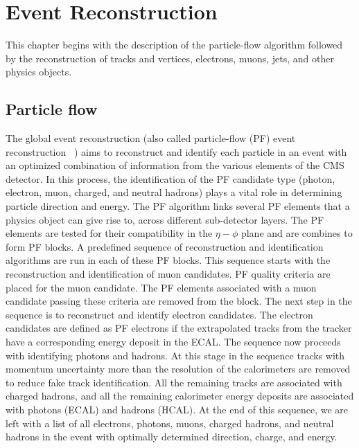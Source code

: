 %
%

\chapter{Event Reconstruction}
\label{chap:event_reco}

This chapter begins with the description of the particle-flow algorithm followed by the reconstruction of tracks and vertices, electrons, muons, jets, and other physics objects.

\section{Particle flow}
\label{p_flow}
The global event reconstruction (also called particle-flow (PF) event reconstruction ~\cite{Sirunyan:2017ulk}) aims to reconstruct and identify each particle in an event with an optimized combination of information from the various elements of the CMS detector. In this process, the identification of the PF candidate type (photon, electron, muon, charged, and neutral hadrons) plays a vital role in determining particle direction and energy. The PF algorithm links several PF elements that a physics object can give rise to, across different sub-detector layers. The PF elements are tested for their compatibility in the $\eta-\phi$ plane and are combines to form PF blocks. A predefined sequence of reconstruction and identification algorithms are run in each of these PF blocks. This sequence starts with the reconstruction and identification of muon candidates. PF quality criteria are placed for the muon candidate. The PF elements associated with a muon candidate passing these criteria are removed from the block. The next step in the sequence is to reconstruct and identify electron candidates. The electron candidates are defined as PF electrons if the extrapolated tracks from the tracker have a corresponding energy deposit in the ECAL. The sequence now proceeds with identifying photons and hadrons. At this stage in the sequence tracks with momentum uncertainty more than the resolution of the calorimeters are removed to reduce fake track identification. All the remaining tracks are associated with charged hadrons, and all the remaining calorimeter energy deposits are associated with photons (ECAL) and hadrons (HCAL). At the end of this sequence, we are left with a list of all electrons, photons, muons, charged hadrons, and neutral hadrons in the event with optimally determined direction, charge, and energy.

